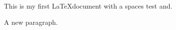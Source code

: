 \documentclass{article}
\begin{document}
This is my first \LaTeX  document with a spaces                 test and.




A new paragraph.
\end{document}
